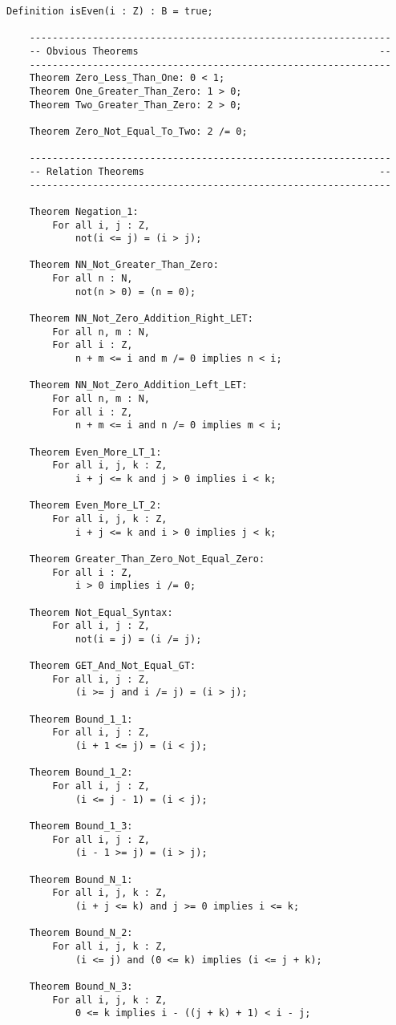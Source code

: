 \begin{lstlisting}[language=resolve]
	Definition isEven(i : Z) : B = true;

	---------------------------------------------------------------
	-- Obvious Theorems                                          --
	---------------------------------------------------------------
	Theorem Zero_Less_Than_One: 0 < 1;
	Theorem One_Greater_Than_Zero: 1 > 0;
	Theorem Two_Greater_Than_Zero: 2 > 0;

	Theorem Zero_Not_Equal_To_Two: 2 /= 0;

	---------------------------------------------------------------
	-- Relation Theorems                                         --
	---------------------------------------------------------------

	Theorem Negation_1:
		For all i, j : Z,
			not(i <= j) = (i > j);

	Theorem NN_Not_Greater_Than_Zero:
		For all n : N,
			not(n > 0) = (n = 0);

	Theorem NN_Not_Zero_Addition_Right_LET:
		For all n, m : N, 
		For all i : Z,
			n + m <= i and m /= 0 implies n < i;

	Theorem NN_Not_Zero_Addition_Left_LET:
		For all n, m : N, 
		For all i : Z,
			n + m <= i and n /= 0 implies m < i;

	Theorem Even_More_LT_1:
		For all i, j, k : Z,
			i + j <= k and j > 0 implies i < k;

	Theorem Even_More_LT_2:
		For all i, j, k : Z,
			i + j <= k and i > 0 implies j < k;

	Theorem Greater_Than_Zero_Not_Equal_Zero:
		For all i : Z,
			i > 0 implies i /= 0;

	Theorem Not_Equal_Syntax:
		For all i, j : Z,
			not(i = j) = (i /= j);

	Theorem GET_And_Not_Equal_GT:
		For all i, j : Z,
			(i >= j and i /= j) = (i > j);

	Theorem Bound_1_1:
		For all i, j : Z,
			(i + 1 <= j) = (i < j);

	Theorem Bound_1_2:
		For all i, j : Z,
			(i <= j - 1) = (i < j);

	Theorem Bound_1_3:
		For all i, j : Z,
			(i - 1 >= j) = (i > j);

	Theorem Bound_N_1:
		For all i, j, k : Z,
			(i + j <= k) and j >= 0 implies i <= k;

	Theorem Bound_N_2:
		For all i, j, k : Z,
			(i <= j) and (0 <= k) implies (i <= j + k);

	Theorem Bound_N_3:
		For all i, j, k : Z,
			0 <= k implies i - ((j + k) + 1) < i - j;


\end{lstlisting}

